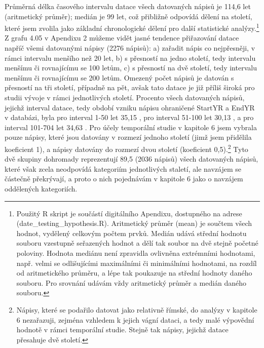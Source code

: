 Průměrná délka časového intervalu datace všech datovaných nápisů je 114,6 let (aritmetický průměr); medián je 99 let, což přibližně odpovídá dělení na století, které jsem zvolila jako základní chronologické dělení pro další statistické analýzy.\footnote{Použitý R skript je součástí digitálního Apendixu, dostupného na adrese \from[url17] (date_testing_hypothesis.R). Aritmetický průměr (mean) je součtem všech hodnot, vydělený celkovým počtem prvků. Medián udává střední hodnotu souboru vzestupně seřazených hodnot a dělí tak soubor na dvě stejně početné poloviny. Hodnota mediánu není zpravidla ovlivněna extrémními hodnotami, např. velmi se odlišujícími maximálními či minimálními hodnotami, na rozdíl od aritmetického průměru, a lépe tak poukazuje na střední hodnoty daného souboru. Pro srovnání udávám vždy aritmetický průměr a medián daného souboru.} Z grafu 4.05 v Apendixu 2 můžeme vidět jasné tendence přiřazování datace napříč všemi datovanými nápisy (2276 nápisů): a) zařadit nápis co nejpřesněji, v rámci intervalu menšího než 20 let, b) s přesností na jedno století, tedy intervalu menšímu či rovnajícímu se 100 letům, c) s přesností na dvě století, tedy intervalu menšímu či rovnajícímu se 200 letům. Omezený počet nápisů je datován s přesností na tři století, případně na pět, avšak tato datace je již příliš široká pro studii vývoje v rámci jednotlivých století. Procento všech datovaných nápisů, jejichž interval datace, tedy období vzniku nápisu ohraničené StartYR a EndYR v databázi, byla pro interval 1-50 let 35,15 , pro interval 51-100 let 30,13 , a pro interval 101-704 let 34,63 . Pro účely temporální studie v kapitole 6 jsem vybrala pouze nápisy, které jsou datovány v rozmezí jednoho století (jimž jsem přidělila koeficient 1), a nápisy datovány do rozmezí dvou století (koeficient 0,5).\footnote{Nápisy, které se podařilo datovat jako relativně římské, do analýzy v kapitole 6 nezařazuji, zejména vzhledem k jejich vágní dataci, a tedy malé výpovědní hodnotě v rámci temporální studie. Stejně tak nápisy, jejichž datace přesahuje dvě století.} Tyto dvě skupiny dohromady reprezentují 89,5  (2036 nápisů) všech datovaných nápisů, které však zcela neodpovídá kategoriím jednotlivých staletí, ale navzájem se částečně překrývají, a proto o nich pojednávám v kapitole 6 jako o navzájem oddělených kategoriích.

